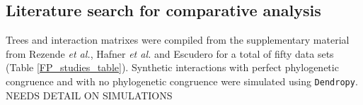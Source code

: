 \subsection{Literature search for comparative analysis}

Trees and interaction matrixes were compiled from the supplementary material from Rezende {\em et al.}, \cite{rezende2007non} Hafner {\em et al.} \cite{hafner1994disparate} and Escudero \cite{escudero2015phylogenetic} for a total of fifty data sets (Table \ref{FP_studies_table}). Synthetic interactions with perfect phylogenetic congruence and with no phylogenetic congruence were simulated using {\tt Dendropy}. \cite{sukumaran2010dendropy} NEEDS DETAIL ON SIMULATIONS